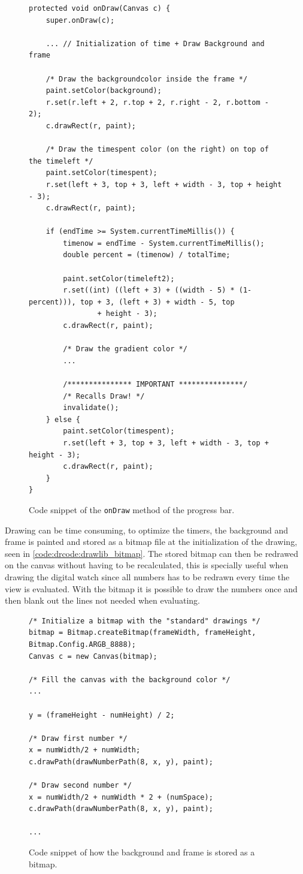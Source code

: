 \begin{figure}[H]%
\begin{lstlisting}
protected void onDraw(Canvas c) {
	super.onDraw(c);
	
	... // Initialization of time + Draw Background and frame

	/* Draw the backgroundcolor inside the frame */
	paint.setColor(background);
	r.set(r.left + 2, r.top + 2, r.right - 2, r.bottom - 2);
	c.drawRect(r, paint);

	/* Draw the timespent color (on the right) on top of the timeleft */
	paint.setColor(timespent);
	r.set(left + 3, top + 3, left + width - 3, top + height - 3);
	c.drawRect(r, paint);

	if (endTime >= System.currentTimeMillis()) {
		timenow = endTime - System.currentTimeMillis();
		double percent = (timenow) / totalTime;

		paint.setColor(timeleft2);
		r.set((int) ((left + 3) + ((width - 5) * (1-percent))), top + 3, (left + 3) + width - 5, top
				+ height - 3);
		c.drawRect(r, paint);

		/* Draw the gradient color */
		...

		/*************** IMPORTANT ***************/
		/* Recalls Draw! */
		invalidate();
	} else {
		paint.setColor(timespent);
		r.set(left + 3, top + 3, left + width - 3, top + height - 3);
		c.drawRect(r, paint);
	}
}
\end{lstlisting}
\caption{Code snippet of the \texttt{onDraw} method of the progress bar.}%
\label{code:backend_drawlib_onDraw}%
\end{figure}

Drawing can be time consuming, to optimize the timers, the background and frame is painted and stored as a bitmap file at the initialization of the drawing, seen in \autoref{code:drcode:drawlib_bitmap}.
The stored bitmap can then be redrawed on the canvas without having to be recalculated, this is specially useful when drawing the digital watch since all numbers has to be redrawn every time the view is evaluated.
With the bitmap it is possible to draw the numbers once and then blank out the lines not needed when evaluating.

\begin{figure}%
\begin{lstlisting}
/* Initialize a bitmap with the "standard" drawings */
bitmap = Bitmap.createBitmap(frameWidth, frameHeight, Bitmap.Config.ARGB_8888);
Canvas c = new Canvas(bitmap);

/* Fill the canvas with the background color */
...

y = (frameHeight - numHeight) / 2;

/* Draw first number */
x = numWidth/2 + numWidth;
c.drawPath(drawNumberPath(8, x, y), paint);

/* Draw second number */
x = numWidth/2 + numWidth * 2 + (numSpace);
c.drawPath(drawNumberPath(8, x, y), paint);

...
\end{lstlisting}
\caption{Code snippet of how the background and frame is stored as a bitmap.}%
\label{code:drawlib_bitmap}%
\end{figure}